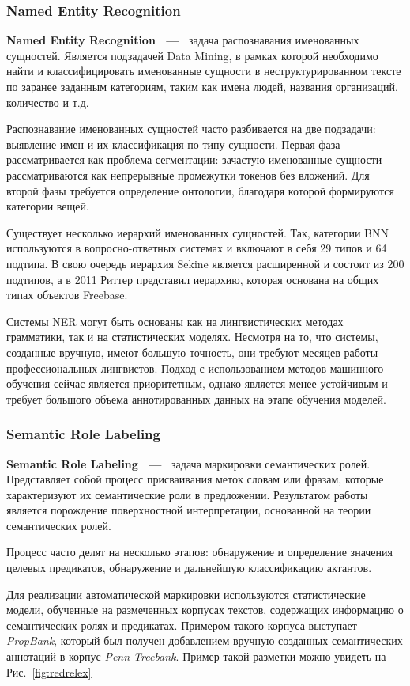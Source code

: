 \subsubsection{Named Entity Recognition}
\textbf{Named Entity Recognition  ~---~} задача распознавания именованных сущностей. 
Является подзадачей Data Mining, в рамках которой необходимо найти и классифицировать именованные сущности в неструктурированном тексте по заранее заданным категориям, таким как имена людей, названия организаций, количество и т.д.

Распознавание именованных сущностей часто разбивается на две подзадачи: выявление имен и их классификация по типу сущности. Первая фаза рассматривается как проблема сегментации: зачастую именованные сущности рассматриваются как непрерывные промежутки токенов без вложений. Для второй фазы требуется определение онтологии, благодаря которой формируются категории вещей.

Существует несколько иерархий именованных сущностей. Так, категории BNN используются в вопросно-ответных системах и включают в себя 29 типов и 64 подтипа. В свою очередь иерархия Sekine является расширенной и состоит из 200 подтипов, а в 2011 Риттер представил иерархию, которая основана на общих типах объектов Freebase. 

Системы NER могут быть основаны как на лингвистических методах грамматики, так и на статистических моделях. Несмотря на то, что системы, созданные вручную, имеют большую точность, они требуют месяцев работы профессиональных лингвистов. Подход с использованием методов машинного обучения сейчас является приоритетным, однако является менее устойчивым и требует большого объема аннотированных данных на этапе обучения моделей. 

\subsubsection{Semantic Role Labeling}
\textbf{Semantic Role Labeling  ~---~} задача маркировки семантических ролей. Представляет собой процесс присваивания меток словам или фразам, которые характеризуют их семантические роли в предложении. Результатом работы является порождение поверхностной интерпретации, основанной на теории семантических ролей.

Процесс часто делят на несколько этапов:  обнаружение и определение значения целевых предикатов, обнаружение и дальнейшую классификацию актантов. 

Для реализации автоматической маркировки используются статистические модели, обученные на размеченных корпусах текстов, содержащих информацию о семантических ролях и предикатах. Примером такого корпуса выступает \emph{PropBank}, который был получен добавлением вручную созданных семантических аннотаций в корпус \emph{Penn Treebank}. Пример такой разметки можно увидеть на Рис.~\ref{fig:redrelex}

